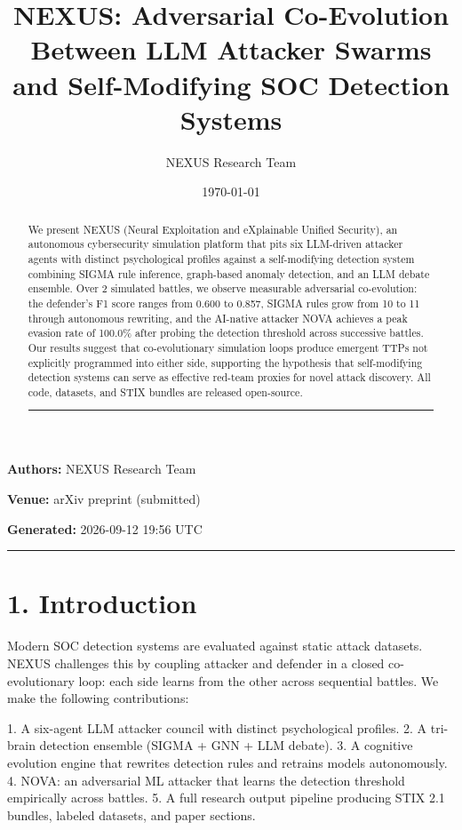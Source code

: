 \documentclass{article}
\title{NEXUS: Adversarial Co-Evolution Between LLM Attacker Swarms and Self-Modifying SOC Detection Systems}
\author{NEXUS Research Team}
\date{\today}
\begin{document}
\maketitle


\textbf{Authors:} NEXUS Research Team  

\textbf{Venue:} arXiv preprint (submitted)  

\textbf{Generated:} 2026-09-12 19:56 UTC  

\hrule\vspace{6pt}

\begin{abstract}

We present NEXUS (Neural Exploitation and eXplainable Unified Security), an autonomous cybersecurity simulation platform that pits six LLM-driven attacker agents with distinct psychological profiles against a self-modifying detection system combining SIGMA rule inference, graph-based anomaly detection, and an LLM debate ensemble. Over 2 simulated battles, we observe measurable adversarial co-evolution: the defender's F1 score ranges from 0.600 to 0.857, SIGMA rules grow from 10 to 11 through autonomous rewriting, and the AI-native attacker NOVA achieves a peak evasion rate of 100.0\% after probing the detection threshold across successive battles. Our results suggest that co-evolutionary simulation loops produce emergent TTPs not explicitly programmed into either side, supporting the hypothesis that self-modifying detection systems can serve as effective red-team proxies for novel attack discovery. All code, datasets, and STIX bundles are released open-source.


\hrule\vspace{6pt}

\end{abstract}

\section{1. Introduction}

Modern SOC detection systems are evaluated against static attack datasets. NEXUS challenges this by coupling attacker and defender in a closed co-evolutionary loop: each side learns from the other across sequential battles. We make the following contributions:

1. A six-agent LLM attacker council with distinct psychological profiles.
2. A tri-brain detection ensemble (SIGMA + GNN + LLM debate).
3. A cognitive evolution engine that rewrites detection rules and retrains models autonomously.
4. NOVA: an adversarial ML attacker that learns the detection threshold empirically across battles.
5. A full research output pipeline producing STIX 2.1 bundles, labeled datasets, and paper sections.
\end{document}

